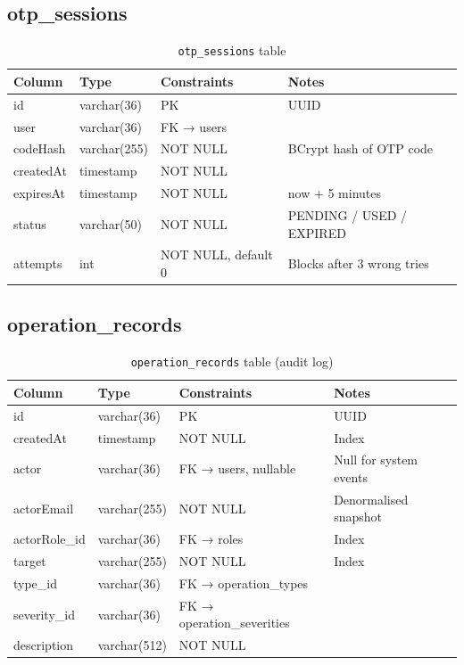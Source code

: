 \documentclass[12pt,a4paper]{report}
\begin{document}
\subsection{otp\_sessions}

\begin{table}[H]
  \centering
  \caption{\texttt{otp\_sessions} table}
  \begin{tabular}{llll}
    \toprule
    \textbf{Column} & \textbf{Type} & \textbf{Constraints} & \textbf{Notes} \\
    \midrule
    id         & varchar(36)  & PK              & UUID \\
    user       & varchar(36)  & FK → users      & \\
    codeHash   & varchar(255) & NOT NULL        & BCrypt hash of OTP code \\
    createdAt  & timestamp    & NOT NULL        & \\
    expiresAt  & timestamp    & NOT NULL        & now + 5 minutes \\
    status     & varchar(50)  & NOT NULL        & PENDING / USED / EXPIRED \\
    attempts   & int          & NOT NULL, default 0 & Blocks after 3 wrong tries \\
    \bottomrule
  \end{tabular}
\end{table}

\subsection{operation\_records}

\begin{table}[H]
  \centering
  \caption{\texttt{operation\_records} table (audit log)}
  \begin{tabular}{llll}
    \toprule
    \textbf{Column}  & \textbf{Type} & \textbf{Constraints} & \textbf{Notes} \\
    \midrule
    id           & varchar(36)  & PK                  & UUID \\
    createdAt    & timestamp    & NOT NULL            & Index \\
    actor        & varchar(36)  & FK → users, nullable & Null for system events \\
    actorEmail   & varchar(255) & NOT NULL            & Denormalised snapshot \\
    actorRole\_id& varchar(36)  & FK → roles          & Index \\
    target       & varchar(255) & NOT NULL            & Index \\
    type\_id     & varchar(36)  & FK → operation\_types & \\
    severity\_id & varchar(36)  & FK → operation\_severities & \\
    description  & varchar(512) & NOT NULL            & \\
    \bottomrule
  \end{tabular}
\end{table}
\end{document}
